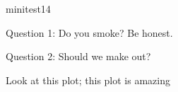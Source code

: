 \documentclass{article}
\begin{document}
\begin{exam}{minitest1}{4}

Question 1: Do you smoke? Be honest.


\newpage

Question 2: Should we make out?

Look at this plot; this plot is amazing

\newpage

\end{exam}
\end{document}
